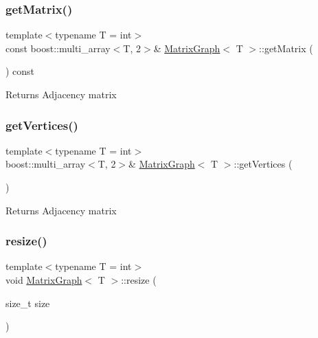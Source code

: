 \subsubsection{\texorpdfstring{get\+Matrix()}{getMatrix()}}
{\footnotesize\ttfamily template$<$typename T = int$>$ \\
const boost\+::multi\+\_\+array$<$T, 2$>$\& \hyperlink{class_matrix_graph}{Matrix\+Graph}$<$ T $>$\+::get\+Matrix (\begin{DoxyParamCaption}{ }\end{DoxyParamCaption}) const\hspace{0.3cm}{\ttfamily [inline]}}

\begin{DoxyReturn}{Returns}
Adjacency matrix 
\end{DoxyReturn}
\mbox{\label{class_matrix_graph_a4775ce045cd24d6ec81755fc571700ea}} 
\subsubsection{\texorpdfstring{get\+Vertices()}{getVertices()}}
{\footnotesize\ttfamily template$<$typename T = int$>$ \\
boost\+::multi\+\_\+array$<$T, 2$>$\& \hyperlink{class_matrix_graph}{Matrix\+Graph}$<$ T $>$\+::get\+Vertices (\begin{DoxyParamCaption}{ }\end{DoxyParamCaption})\hspace{0.3cm}{\ttfamily [inline]}}

\begin{DoxyReturn}{Returns}
Adjacency matrix 
\end{DoxyReturn}
\mbox{\label{class_matrix_graph_acc5d5c603987bc7a00fc11d37f1edd83}} 
\subsubsection{\texorpdfstring{resize()}{resize()}}
{\footnotesize\ttfamily template$<$typename T = int$>$ \\
void \hyperlink{class_matrix_graph}{Matrix\+Graph}$<$ T $>$\+::resize (\begin{DoxyParamCaption}\item[{size\+\_\+t}]{size }\end{DoxyParamCaption})\hspace{0.3cm}{\ttfamily [inline]}}

